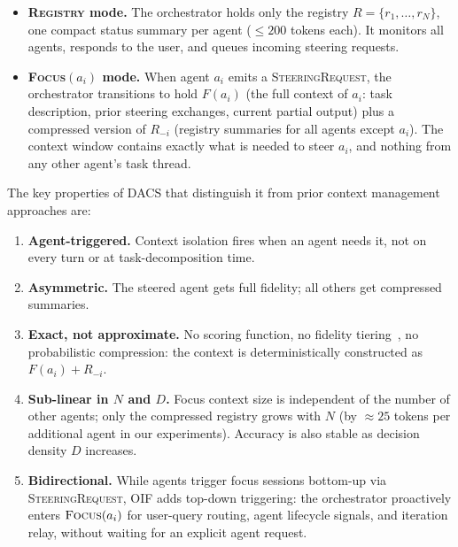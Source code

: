 \documentclass{article}
\begin{document}
\begin{itemize}
  \item \textbf{\textsc{Registry} mode.} The orchestrator holds only the
  registry $R = \{r_1, \ldots, r_N\}$, one compact status summary per
  agent ($\leq 200$ tokens each).
  It monitors all agents, responds to the user, and queues incoming
  steering requests.

  \item \textbf{\textsc{Focus}$(a_i)$ mode.} When agent $a_i$ emits a
  \textsc{SteeringRequest}, the orchestrator transitions to hold $F(a_i)$
  (the full context of $a_i$: task description, prior steering exchanges,
  current partial output) plus a compressed version of $R_{-i}$
  (registry summaries for all agents except $a_i$).
  The context window contains exactly what is needed to steer $a_i$,
  and nothing from any other agent's task thread.
\end{itemize}

The key properties of DACS that distinguish it from prior context
management approaches are:
\begin{enumerate}
  \item \textbf{Agent-triggered.} Context isolation fires when an agent
  needs it, not on every turn or at task-decomposition time.
  \item \textbf{Asymmetric.} The steered agent gets full fidelity;
  all others get compressed summaries.
  \item \textbf{Exact, not approximate.} No scoring function, no fidelity
  tiering~\citep{afm2024,lemon2025}, no probabilistic compression: the
  context is deterministically constructed as $F(a_i) + R_{-i}$.
  \item \textbf{Sub-linear in $N$ and $D$.} Focus context size is
  independent of the number of other agents; only the compressed registry
  grows with $N$ (by $\approx 25$ tokens per additional agent in our
  experiments). Accuracy is also stable as decision density $D$ increases.
  \item \textbf{Bidirectional.} While agents trigger focus sessions
  bottom-up via \textsc{SteeringRequest}, OIF adds top-down triggering:
  the orchestrator proactively enters $\textsc{Focus}(a_i)$ for
  user-query routing, agent lifecycle signals, and iteration relay,
  without waiting for an explicit agent request.
\end{enumerate}
\end{document}
